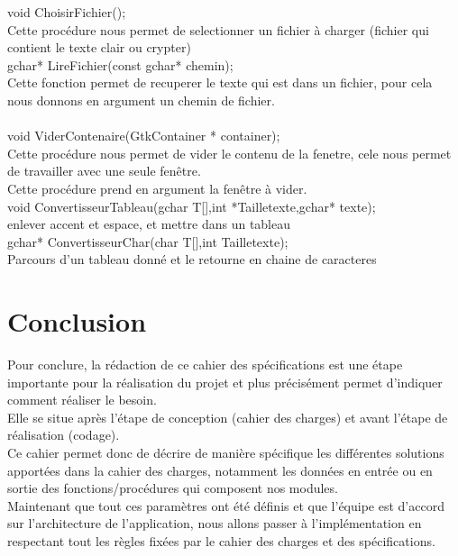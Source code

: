 \documentclass[a4]{article}
\begin{document}
	void ChoisirFichier();\\
		Cette procédure nous permet de selectionner un fichier à charger (fichier qui contient le texte clair ou 		crypter)\\

		
	gchar* LireFichier(const gchar* chemin);\\
		Cette fonction permet de recuperer le texte qui est dans un fichier, pour cela nous donnons en argument un chemin de fichier.\\
	
	\\
	
	void ViderContenaire(GtkContainer * container);\\
		Cette procédure nous permet de vider le contenu de la fenetre, cele nous permet de travailler avec une seule fenêtre.\\
		Cette procédure prend en argument la fenêtre à vider.\\
	
	void ConvertisseurTableau(gchar T[],int *Tailletexte,gchar* texte);\\
		enlever accent et espace, et mettre dans un tableau\\
	 
	gchar* ConvertisseurChar(char T[],int Tailletexte); \\
		Parcours d'un tableau donné et le retourne en chaine de caracteres\\
		
	
	\section{Conclusion}
	
	Pour conclure, la rédaction de ce cahier des spécifications est une étape importante pour la réalisation du projet
	et plus précisément permet d'indiquer comment réaliser le besoin.\\
	
	Elle se situe après l'étape de conception (cahier des charges) et avant l'étape de réalisation (codage).\\
	
	Ce cahier permet donc de décrire de manière spécifique les différentes solutions apportées dans la cahier des charges, notamment les données en entrée
	ou en sortie des fonctions/procédures qui composent nos modules.\\
	
	Maintenant que tout ces paramètres ont été définis et que l'équipe est d'accord sur l'architecture de l'application, nous allons
	passer à l'implémentation en respectant tout les règles fixées par le cahier des charges et des spécifications.
	
\end{document}

